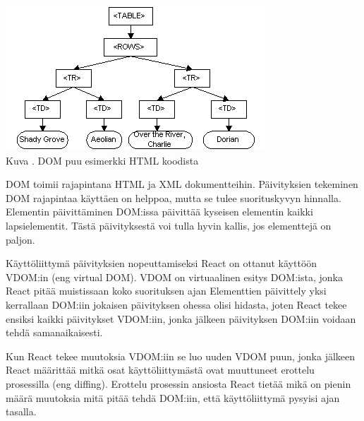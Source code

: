 \bigskip
\includegraphics{./src/public/oppar/dom.png}\\
Kuva \getImgCount {}. DOM puu esimerkki HTML koodista 
\medskip



DOM toimii rajapintana HTML ja XML dokumentteihin.
Päivityksien tekeminen DOM rajapintaa käyttäen on helppoa, mutta se tulee suorituskyvyn hinnalla.
Elementin päivittäminen DOM:issa päivittää kyseisen elementin kaikki lapsielementit. 
Tästä päivityksestä voi tulla hyvin kallis, jos elementtejä on paljon.
\bigskip





Käyttöliittymä päivityksien nopeuttamiseksi React on ottanut käyttöön VDOM:in (eng virtual DOM).
VDOM on virtuaalinen esitys DOM:ista, jonka React pitää muistissaan koko suorituksen ajan
Elementtien päivittely yksi kerrallaan DOM:iin jokaisen päivityksen ohessa olisi hidasta,
joten React tekee ensiksi kaikki päivitykset VDOM:iin, jonka jälkeen päivityksen DOM:iin voidaan tehdä samanaikaisesti.
%
%
\medskip

Kun React tekee muutoksia VDOM:iin se luo uuden VDOM puun, jonka jälkeen
React määrittää mitkä osat käyttöliittymästä ovat muuttuneet erottelu prosessilla (eng diffing).
Erottelu prosessin ansiosta React tietää mikä on pienin määrä muutoksia mitä pitää tehdä DOM:iin, 
että käyttöliittymä pysyisi ajan tasalla.
\medskip



